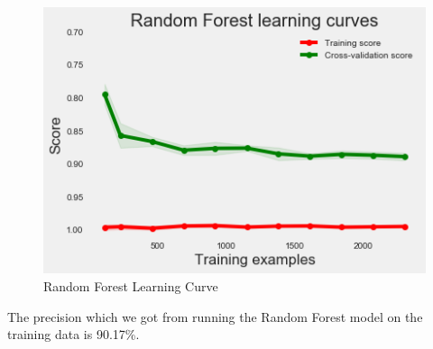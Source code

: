 \begin{figure}
\caption{Random Forest Learning Curve}
\label{5.3}
\centering
\includegraphics[width=\columnwidth]{images/5_3.png}
\end{figure}

The precision which we got from running the Random Forest model on the training data is 90.17\%.


